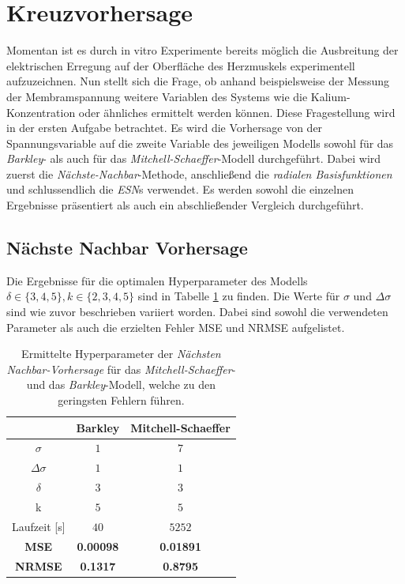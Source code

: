 \section{Kreuzvorhersage}
\label{sec:exp_cross_pred}
Momentan ist es durch in vitro Experimente bereits möglich die Ausbreitung der elektrischen Erregung auf der Oberfläche des Herzmuskels experimentell aufzuzeichnen. Nun stellt sich die Frage, ob anhand beispielsweise der Messung der Membramspannung weitere Variablen des Systems wie die Kalium-Konzentration oder ähnliches ermittelt werden können. Diese Fragestellung wird in der ersten Aufgabe betrachtet. Es wird die Vorhersage von der Spannungsvariable auf die zweite Variable des jeweiligen Modells sowohl für das \textit{Barkley}- als auch für das \textit{Mitchell-Schaeffer}-Modell durchgeführt. Dabei wird zuerst die \textit{Nächste-Nachbar}-Methode, anschließend die \textit{radialen Basisfunktionen} und schlussendlich die \textit{ESN}s verwendet. Es werden sowohl die einzelnen Ergebnisse präsentiert als auch ein abschließender Vergleich durchgeführt.
 
\subsection{Nächste Nachbar Vorhersage}
Die Ergebnisse für die optimalen Hyperparameter des Modells $\delta \in \{3,4,5\}, k \in \{2, 3, 4, 5\}$ sind in Tabelle \ref{tab:exp_cross_nn_results} zu finden. Die Werte für $\sigma$ und $\Delta \sigma$ sind wie zuvor beschrieben variiert worden. Dabei sind sowohl die verwendeten Parameter als auch die erzielten Fehler MSE und NRMSE aufgelistet.
\begin{table}[h]
	\centering

	\begin{tabular}{ccc}
		\hline		
		\multicolumn{1}{c}{} & Barkley & Mitchell-Schaeffer \\ 
		\hline 
		\rule[-1ex]{0pt}{2.5ex} $\sigma$ & $1$ & $7$ \\ 
		\rule[-1ex]{0pt}{2.5ex} $\Delta \sigma$ & $1$ & $1$ \\ 
		\rule[-1ex]{0pt}{2.5ex} $\delta$ & $3$ & $3$ \\ 
		\rule[-1ex]{0pt}{2.5ex} k & $5$ & $5$ \\ 
		\rule[-1ex]{0pt}{2.5ex} Laufzeit [s] & $40$ & $5252$ \\ 
		\rule[-1ex]{0pt}{2.5ex} \textbf{MSE} & \textbf{0.00098} & \textbf{0.01891} \\ 
		\rule[-1ex]{0pt}{2.5ex} \textbf{NRMSE} & \textbf{0.1317} & \textbf{0.8795} \\ 
		\hline 
	\end{tabular} 

	\caption{Ermittelte Hyperparameter der \textit{Nächsten Nachbar-Vorhersage} für das \textit{Mitchell-Schaeffer}- und das \textit{Barkley}-Modell, welche zu den geringsten Fehlern führen.}
\label{tab:exp_cross_nn_results}
\end{table} 

